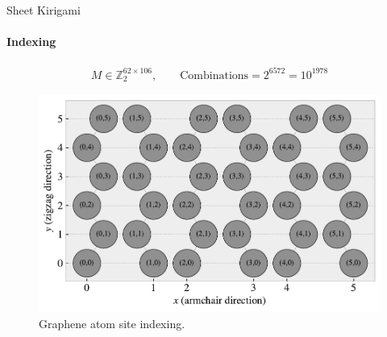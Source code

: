 \documentclass[
	10pt, %
]{beamer}
\begin{document}
%
%
\begin{frame}{Sheet Kirigami}
	\framesubtitle{Indexing}
	\begin{align*}
		M \in \mathbb{Z}_2^{62 \times 106}, \qquad \text{Combinations} = 2^{6572} = 10^{1978}
	\end{align*}
	\begin{figure}[H]
		\centering
		\includegraphics[width=0.7\linewidth]{../thesis/figures/system/atom_indexing.pdf}
		\caption{Graphene atom site indexing.}
	\end{figure}	
\end{frame}
%
%
%
%
\end{document}
